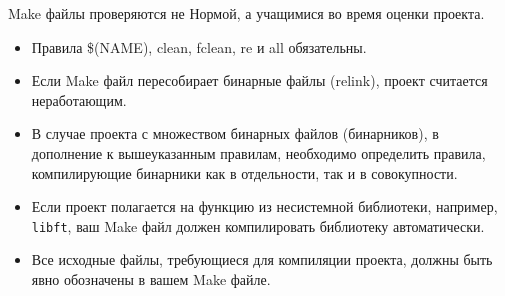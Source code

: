 \documentclass{42-ru}
\begin{document}
            Make файлы проверяются не Нормой, а учащимися во время оценки проекта.
            \begin{itemize}

                \item Правила \$(NAME), clean, fclean, re и all обязательны.

                \item Если Make файл пересобирает бинарные файлы (relink), проект считается неработающим.

                \item В случае проекта с множеством бинарных файлов (бинарников), в дополнение к вышеуказанным правилам, необходимо определить правила, компилирующие бинарники как в отдельности, так и в совокупности.

                \item Если проект полагается на функцию из несистемной библиотеки, например, \texttt{libft}, ваш Make файл должен компилировать библиотеку автоматически.

                \item Все исходные файлы, требующиеся для компиляции проекта, должны быть явно обозначены в вашем Make файле.

            \end{itemize}
\end{document}
